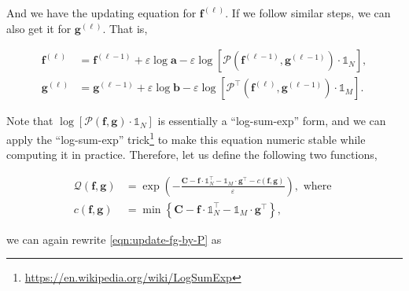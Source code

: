 And we have the updating equation for $\mathbf{f}^{(\ell)}$.
If we follow similar steps, we can also get it for $\mathbf{g}^{(\ell)}$.
That is,

\begin{equation}\label{eqn:update-fg-by-P}
  \begin{aligned}
    \mathbf{f}^{(\ell)}
     & = \mathbf{f}^{(\ell-1)} + \varepsilon\log \mathbf{a} -\varepsilon\log
    \left[
      \mathcal{P} \left(\mathbf{f}^{(\ell-1)}, \mathbf{g}^{(\ell-1)}\right)\cdot \mathbb{1}_N
    \right],                                                                 \\
    \mathbf{g}^{(\ell)}
     & = \mathbf{g}^{(\ell-1)} + \varepsilon\log \mathbf{b} -\varepsilon\log
    \left[
      \mathcal{P}^\top \left(\mathbf{f}^{(\ell)}, \mathbf{g}^{(\ell-1)}\right) \cdot \mathbb{1}_M
      \right].
  \end{aligned}
\end{equation}


Note that $\log \left[\mathcal{P}(\mathbf{f}, \mathbf{g})\cdot \mathbb{1}_N\right]$
is essentially a ``log-sum-exp'' form, and we can apply the ``log-sum-exp'' trick\footnote{
  \url{https://en.wikipedia.org/wiki/LogSumExp}
} to make this equation numeric stable while computing it in practice.
Therefore, let us define the following two functions,

\begin{equation}\label{eqn:function-c-and-Q}
  \begin{aligned}
    \mathcal{Q} \left(\mathbf{f}, \mathbf{g}\right)
     & = \exp \left(
    - \frac{
      \mathbf{C} - \mathbf{f} \cdot \mathbb{1}_N^\top - \mathbb{1}_M \cdot \mathbf{g}^\top
      - c \left(\mathbf{f}, \mathbf{g}\right)
    }{\varepsilon}
    \right), \text{ where }                                                                                        \\
    c \left(\mathbf{f}, \mathbf{g}\right)
     & = \min \left\{\mathbf{C} - \mathbf{f} \cdot \mathbb{1}_N^\top - \mathbb{1}_M \cdot \mathbf{g}^\top\right\},
  \end{aligned}
\end{equation}


we can again rewrite \cref{eqn:update-fg-by-P} as

